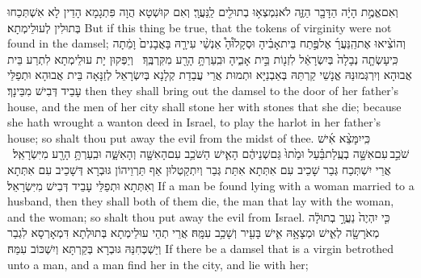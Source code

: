 {וְאִם\maqqaf אֱמֶ֣ת הָיָ֔ה הַדָּבָ֖ר הַזֶּ֑ה לֹא\maqqaf נִמְצְא֥וּ בְתוּלִ֖ים לַֽנַּעֲרָֽ׃}
{וְאִם קוּשְׁטָא הֲוָה פִּתְגָמָא הָדֵין לָא אִשְׁתְּכַחוּ בְּתוּלִין לְעוּלֵימְתָא׃}
{But if this thing be true, that the tokens of virginity were not found in the damsel;}{}
{וְהוֹצִ֨יאוּ אֶת\maqqaf הַֽנַּעֲרָ֜ אֶל\maqqaf פֶּ֣תַח בֵּית\maqqaf אָבִ֗יהָ וּסְקָל֩וּהָ֩ אַנְשֵׁ֨י עִירָ֤הּ בָּאֲבָנִים֙ וָמֵ֔תָה כִּֽי\maqqaf עָשְׂתָ֤ה נְבָלָה֙ בְּיִשְׂרָאֵ֔ל לִזְנ֖וֹת בֵּ֣ית אָבִ֑יהָ וּבִֽעַרְתָּ֥ הָרָ֖ע מִקִּרְבֶּֽךָ׃ \setuma }
{וְיַפְּקוּן יָת עוּלֵימְתָא לִתְרַע בֵּית אֲבוּהָא וְיִרְגְּמוּנַּהּ אֱנָשֵׁי קַרְתַּהּ בְּאַבְנַיָּא וּתְמוּת אֲרֵי עֲבַדַת קְלָנָא בְּיִשְׂרָאֵל לְזַנָּאָה בֵּית אֲבוּהָא וּתְפַלֵּי עָבֵיד דְּבִישׁ מִבֵּינָךְ׃}
{then they shall bring out the damsel to the door of her father’s house, and the men of her city shall stone her with stones that she die; because she hath wrought a wanton deed in Israel, to play the harlot in her father’s house; so shalt thou put away the evil from the midst of thee.}{}
{כִּֽי\maqqaf יִמָּצֵ֨א אִ֜ישׁ שֹׁכֵ֣ב \legarmeh  עִם\maqqaf אִשָּׁ֣ה בְעֻֽלַת\maqqaf בַּ֗עַל וּמֵ֙תוּ֙ גַּם\maqqaf שְׁנֵיהֶ֔ם הָאִ֛ישׁ הַשֹּׁכֵ֥ב עִם\maqqaf הָאִשָּׁ֖ה וְהָאִשָּׁ֑ה וּבִֽעַרְתָּ֥ הָרָ֖ע מִיִּשְׂרָאֵֽל׃ \setuma }
{אֲרֵי יִשְׁתְּכַח גְּבַר שָׁכֵיב עִם אִתְּתָא אִתַּת גְּבַר וְיִתְקַטְלוּן אַף תַּרְוֵיהוֹן גּוּבְרָא דְּשָׁכֵיב עִם אִתְּתָא וְאִתְּתָא וּתְפַלֵּי עָבֵיד דְּבִישׁ מִיִּשְׂרָאֵל׃}
{If a man be found lying with a woman married to a husband, then they shall both of them die, the man that lay with the woman, and the woman; so shalt thou put away the evil from Israel.}{}
{כִּ֤י יִהְיֶה֙ נַעֲרָ֣ בְתוּלָ֔ה מְאֹרָשָׂ֖ה לְאִ֑ישׁ וּמְצָאָ֥הּ אִ֛ישׁ בָּעִ֖יר וְשָׁכַ֥ב עִמָּֽהּ׃}
{אֲרֵי תְהֵי עוּלֵימְתָא בְּתוּלְתָא דִּמְאָרְסָא לִגְבַר וְיַשְׁכְּחִנַּהּ גּוּבְרָא בְּקַרְתָּא וְיִשְׁכּוֹב עִמַּהּ׃}
{If there be a damsel that is a virgin betrothed unto a man, and a man find her in the city, and lie with her;}{}

